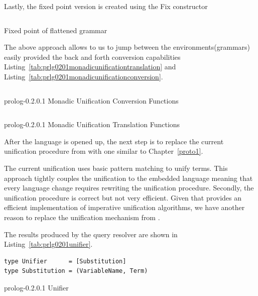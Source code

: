 \documentclass[thesis-solanki.tex]{subfiles}
\begin{document}
Lastly, the fixed point version is created using the Fix constructor
\begin{code-list}[H]
  \begin{singlespace}
    \inputminted[linenos]{haskell}{haskell-proto2-fix-flattened.hs}
  \end{singlespace}
  \caption{Fixed point of flattened grammar}
\label{tab:fixflatgrp0201}
\end{code-list}

The above approach allows to us to jump between the environments(grammars) easily provided the back and forth conversion capabilities 
Listing~\ref{tab:prlg0201monadicunificationtranslation} and Listing~\ref{tab:prlg0201monadicunificationconversion}.

\begin{code-list}[H]
  \begin{singlespace}
    \inputminted[linenos]{haskell}{haskell-proto2-monadic-unification-conversion.hs}
  \end{singlespace}
\caption{prolog-0.2.0.1 Monadic Unification Conversion Functions}
\label{tab:prlg0201monadicunificationconversion}
\end{code-list}

\begin{code-list}[H]
  \begin{singlespace}
    \inputminted[linenos]{haskell}{haskell-proto2-monadic-unification-translation.hs}
  \end{singlespace}
\caption{prolog-0.2.0.1 Monadic Unification Translation Functions}
\label{tab:prlg0201monadicunificationtranslation}
\end{code-list}


After the language is opened up, the next step is to replace the current unification procedure from  \cite{prolog-lib} with one 
similar to Chapter~\ref{proto1}.


The current unification uses basic pattern matching to unify terms. This approach tightly couples the unification to the embedded language meaning that every 
language change requires rewriting the unification procedure. Secondly, the unification procedure is correct but not very efficient. Given that 
 \cite{unification-fd-lib} provides an efficient implementation of imperative unification algorithms, we have another reason to 
replace the unification mechanism from  \cite{prolog-lib}.  

The results produced by the query resolver are shown in Listing~\ref{tab:prlg0201unifier}.
\begin{code-list}[H]
\begin{verbatim}
type Unifier      = [Substitution]
type Substitution = (VariableName, Term)
\end{verbatim}
\caption{prolog-0.2.0.1 Unifier}
\label{tab:prlg0201unifier}
\end{code-list}
\end{document}
